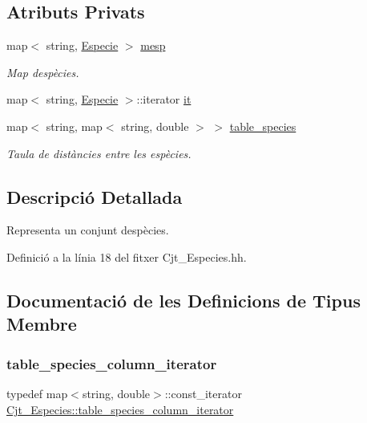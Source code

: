 \subsection*{Atributs Privats}
\begin{DoxyCompactItemize}
\item 
map$<$ string, \hyperlink{class_especie}{Especie} $>$ \hyperlink{class_cjt___especies_a64a525b38c78935e7432b362ea9a2306}{mesp}
\begin{DoxyCompactList}\small\item\em Map d\textquotesingle{}espècies. \end{DoxyCompactList}\item 
map$<$ string, \hyperlink{class_especie}{Especie} $>$\+::iterator \hyperlink{class_cjt___especies_a25b19415a21bdabe9e2fc2ad7d2f68a5}{it}
\item 
map$<$ string, map$<$ string, double $>$ $>$ \hyperlink{class_cjt___especies_ae56d242080836b8d3db505f0a8623090}{table\+\_\+species}
\begin{DoxyCompactList}\small\item\em Taula de distàncies entre les espècies. \end{DoxyCompactList}\end{DoxyCompactItemize}


\subsection{Descripció Detallada}
Representa un conjunt d\textquotesingle{}espècies. 

Definició a la línia 18 del fitxer Cjt\+\_\+\+Especies.\+hh.



\subsection{Documentació de les Definicions de Tipus Membre}
\mbox{\label{class_cjt___especies_a11316f4de57c3d78183137abe33b31c5}} 
\subsubsection{\texorpdfstring{table\+\_\+species\+\_\+column\+\_\+iterator}{table\_species\_column\_iterator}}
{\footnotesize\ttfamily typedef map$<$string, double$>$\+::const\+\_\+iterator \hyperlink{class_cjt___especies_a11316f4de57c3d78183137abe33b31c5}{Cjt\+\_\+\+Especies\+::table\+\_\+species\+\_\+column\+\_\+iterator}\hspace{0.3cm}{\ttfamily [private]}}



